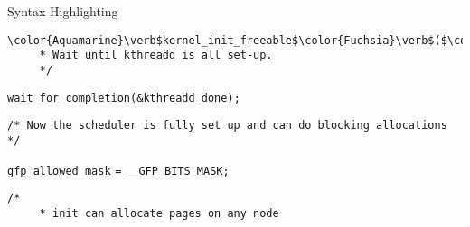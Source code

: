 \begin{frame}{Syntax Highlighting}
\begin{verbatim}
\color{Aquamarine}\verb$kernel_init_freeable$\color{Fuchsia}\verb$($\color{BurntOrange}\verb$void$\color{Fuchsia}\verb$)$\newline\color{Fuchsia}\verb${$\newline\tab\color{Rhodamine}\begin{verbatim}/*
	 * Wait until kthreadd is all set-up.
	 */\end{verbatim}\leavevmode\newline\tab\color{Aquamarine}\verb$wait_for_completion$\color{Fuchsia}\verb$($\color{Goldenrod}\verb$&$\color{Aquamarine}\verb$kthreadd_done$\color{Fuchsia}\verb$)$\color{Fuchsia}\verb$;$\newline\newline\tab\color{Rhodamine}\begin{verbatim}/* Now the scheduler is fully set up and can do blocking allocations */\end{verbatim}\leavevmode\newline\tab\color{Aquamarine}\verb$gfp_allowed_mask$ \color{Fuchsia}\verb$=$ \color{Aquamarine}\verb$__GFP_BITS_MASK$\color{Fuchsia}\verb$;$\newline\newline\tab\color{Rhodamine}\begin{verbatim}/*
	 * init can allocate pages on any node

\end{verbatim}
\end{frame}
